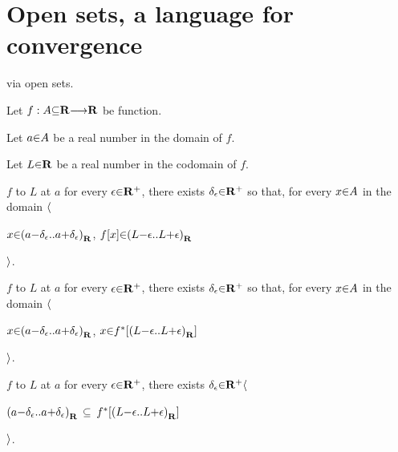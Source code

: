 \section{Open sets, a language for convergence}

\vs
{} via open sets. \par
Let $f: A\p\subseteq\R \to \R$ be function. \par
Let $a \p\in A$  be a real number in the domain   of $f$. \par
Let $L \p\in \R$ be a real number in the codomain of $f$. \par
   $f$  to $L$ at $a$  for every $\epsilon \p\in \R^+$, there exists $\delta_\epsilon \p\in \R^+$ so that, for every $x \p\in A$ in the domain $\a\langle$ \par
      \hs\hs\hs {} $x \p\in \a(a\p-\delta_\epsilon \a{..} a\p+\delta_\epsilon\a)_\R$,  $f[x] \p\in \a(L\p-\epsilon \a{..} L\p+\epsilon\a)_\R$ \par
    \hs\hs $\a\rangle$. \par
   $f$  to $L$ at $a$  for every $\epsilon \p\in \R^+$, there exists $\delta_\epsilon \p\in \R^+$ so that, for every $x \p\in A$ in the domain $\a\langle$ \par
      \hs\hs\hs {} $x \p\in \a(a\p-\delta_\epsilon \a{..} a\p+\delta_\epsilon\a)_\R$,  $x \p\in f^*[\a(L\p-\epsilon \a{..} L\p+\epsilon\a)_\R]$ \par
    \hs\hs $\a\rangle$. \par
   $f$  to $L$ at $a$  for every $\epsilon \p\in \R^+$, there exists $\delta_\epsilon \p\in \R^+ \a\langle$ \par
      \hs\hs\hs $\a(a\p-\delta_\epsilon \a{..} a\p+\delta_\epsilon\a)_\R$ $\p\subseteq$ $f^*[\a(L\p-\epsilon \a{..} L\p+\epsilon\a)_\R]$ \par
    \hs\hs $\a\rangle$. \par
